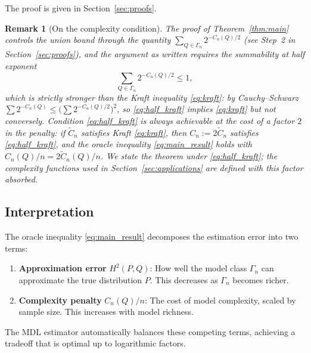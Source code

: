 \documentclass[preprint,review,12pt]{article}
\newtheorem{remark}[theorem]{Remark}
\begin{document}
The proof is given in Section~\ref{sec:proofs}.

\begin{remark}[On the complexity condition]\label{rem:half_kraft}
The proof of Theorem~\ref{thm:main} controls the union bound through the
quantity $\sum_{Q \in \Gamma_n} 2^{-C_n(Q)/2}$ (see Step~2 in
Section~\ref{sec:proofs}), and the argument as written requires the
\emph{summability at half exponent}
\begin{equation}\label{eq:half_kraft}
	\sum_{Q \in \Gamma_n} 2^{-C_n(Q)/2} \leq 1,
\end{equation}
which is strictly stronger than the Kraft inequality \eqref{eq:kraft}: by
Cauchy--Schwarz $\sum 2^{-C_n(Q)} \leq \big(\sum 2^{-C_n(Q)/2}\big)^2$, so
\eqref{eq:half_kraft} implies \eqref{eq:kraft} but not conversely. Condition
\eqref{eq:half_kraft} is always achievable at the cost of a factor $2$ in the
penalty: if $\tilde C_n$ satisfies Kraft \eqref{eq:kraft}, then
$C_n := 2\tilde C_n$ satisfies \eqref{eq:half_kraft}, and the oracle inequality
\eqref{eq:main_result} holds with $C_n(Q)/n = 2\tilde C_n(Q)/n$. We state the
theorem under \eqref{eq:half_kraft}; the complexity functions used in
Section~\ref{sec:applications} are defined with this factor absorbed.
\end{remark}

\subsection{Interpretation}

The oracle inequality \eqref{eq:main_result} decomposes the estimation error 
into two terms:

\begin{enumerate}
\item \textbf{Approximation error} $H^2(P, Q)$: How well the model class 
$\Gamma_n$ can approximate the true distribution $P$. This decreases as 
$\Gamma_n$ becomes richer.

\item \textbf{Complexity penalty} $C_n(Q)/n$: The cost of model complexity, 
scaled by sample size. This increases with model richness.
\end{enumerate}

The MDL estimator automatically balances these competing terms, achieving 
a tradeoff that is optimal up to logarithmic factors.
\end{document}
